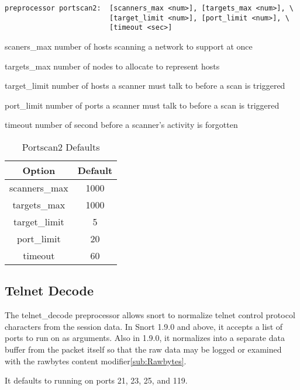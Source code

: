 \documentclass[english]{report}
\begin{document}
\begin{verbatim}
preprocessor portscan2:  [scanners_max <num>], [targets_max <num>], \
                         [target_limit <num>], [port_limit <num>], \
                         [timeout <sec>]
\end{verbatim}
\begin{list}{}
\item [scaners\_max]number of hosts scanning a network to support at once
\item [targets\_max]number of nodes to allocate to represent hosts
\item [target\_limit]number of hosts a scanner must talk to before a scan
is triggered
\item [port\_limit]number of ports a scanner must talk to before a scan
is triggered
\item [timeout]number of second before a scanner's activity is forgotten
\end{list}
%
\begin{table}[!hbpt]

\caption{Portscan2 Defaults\label{portscan2 defaults}}

\begin{center}\begin{tabular}{|c|c|}
\hline 
Option&
Default\\
\hline
\hline 
scanners\_max&
1000\\
\hline 
targets\_max&
1000\\
\hline 
target\_limit&
5\\
\hline 
port\_limit&
20\\
\hline 
timeout&
60\\
\hline
\end{tabular}\end{center}
\end{table}

\subsection{Telnet Decode\label{sub:Telnet-Decode}}

The telnet\_decode preprocessor allows snort to normalize telnet control
protocol characters from the session data. In Snort 1.9.0 and above,
it accepts a list of ports to run on as arguments. Also in 1.9.0,
it normalizes into a separate data buffer from the packet itself so
that the raw data may be logged or examined with the rawbytes content
modifier\ref{sub:Rawbytes}.

It defaults to running on ports 21, 23, 25, and 119.
\end{document}
